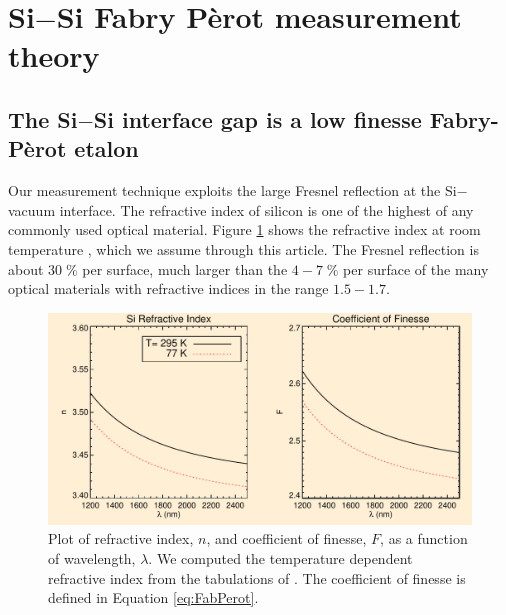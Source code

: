 \section{Si$-$Si Fabry P\`{e}rot measurement theory}
\label{secTheory}

\subsection{The Si$-$Si interface gap is a low finesse Fabry-P\`{e}rot etalon}

Our measurement technique exploits the large Fresnel reflection \cite{2001opt4.book.....H} at the Si$-$vacuum interface.  The refractive index of silicon is one of the highest of any commonly used optical material.  Figure \ref{figSiIndexFinesse} shows the refractive index at room temperature \cite{2006SPIE.6273E..77F}, which we assume through this article.  The Fresnel reflection is about $30\;\%$ per surface, much larger than the $4-7\;\%$ per surface of the many optical materials with refractive indices in the range $1.5-1.7$.

\begin{figure}[htbp]
\includegraphics[width=0.95\columnwidth]{chSiGaps/figs/SiIndexAOmgsFinesseFig.pdf}
\caption{Plot of refractive index, $n$, and coefficient of finesse, $F$, as a function of wavelength, $\lambda$.\label{figSiIndexFinesse} We computed the temperature dependent refractive index from the tabulations of \cite{2006SPIE.6273E..77F}.  The coefficient of finesse is defined in Equation \ref{eq:FabPerot}.}
\end{figure}

